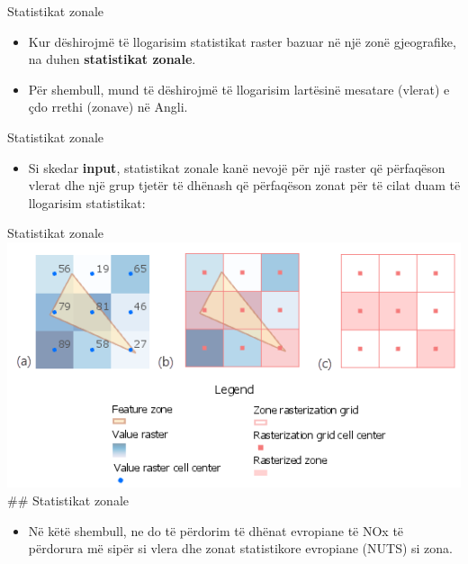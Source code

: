 \documentclass[
  ignorenonframetext,
]{beamer}
\providecommand{\tightlist}{%
  \setlength{\itemsep}{0pt}\setlength{\parskip}{0pt}}
\begin{document}
\begin{frame}{Statistikat zonale}
\protect\hypertarget{statistikat-zonale}{}
\begin{itemize}
\item
  Kur dëshirojmë të llogarisim statistikat raster bazuar në një zonë
  gjeografike, na duhen \textbf{statistikat zonale}.
\item
  Për shembull, mund të dëshirojmë të llogarisim lartësinë mesatare
  (vlerat) e çdo rrethi (zonave) në Angli.
\end{itemize}
\end{frame}

\begin{frame}{Statistikat zonale}
\protect\hypertarget{statistikat-zonale-1}{}
\begin{itemize}
\tightlist
\item
  Si skedar \textbf{input}, statistikat zonale kanë nevojë për një
  raster që përfaqëson vlerat dhe një grup tjetër të dhënash që
  përfaqëson zonat për të cilat duam të llogarisim statistikat:
\end{itemize}
\end{frame}

\begin{frame}{Statistikat zonale}
\protect\hypertarget{statistikat-zonale-2}{}
\includegraphics{./Figs/zonal1.png} \#\# Statistikat zonale

\begin{itemize}
\tightlist
\item
  Në këtë shembull, ne do të përdorim të dhënat evropiane të NOx të
  përdorura më sipër si vlera dhe zonat statistikore evropiane (NUTS) si
  zona.
\end{itemize}
\end{frame}
\end{document}
